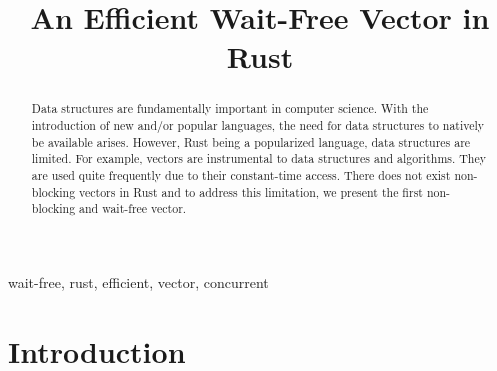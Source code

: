 \documentclass[conference]{IEEEtran}
\begin{document}
\title{An Efficient Wait-Free Vector in Rust}

\author{
\and
{}
\and
{}
\and
{}
}

\maketitle

\begin{abstract}

Data structures are fundamentally important in computer science. With the introduction of new and/or popular languages, the need for data structures to natively be available arises. However, Rust being a popularized language, data structures are limited. For example, vectors are instrumental to data structures and algorithms. They are used quite frequently due to their constant-time access. There does not exist non-blocking vectors in Rust and to address this limitation, we present the first non-blocking and wait-free vector.

\end{abstract}

\begin{IEEEkeywords}
wait-free, rust, efficient, vector, concurrent
\end{IEEEkeywords}

\section{Introduction}
\end{document}
